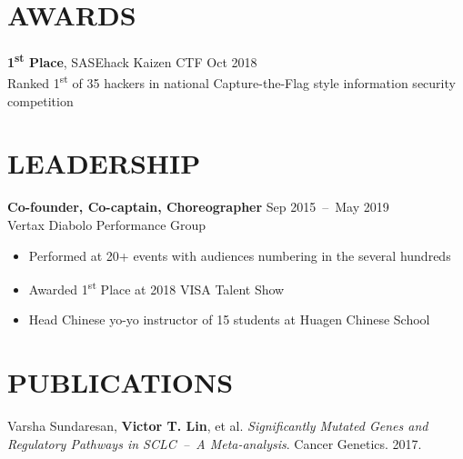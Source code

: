 \documentclass[line,resmargin]{res}
\begin{document}
\begin{resume}
\section{AWARDS}
    \textbf{1\textsuperscript{st} Place}, SASEhack Kaizen CTF    \hfill Oct 2018 \\
    Ranked 1\textsuperscript{st} of 35 hackers in national Capture-the-Flag style information security competition

\section{LEADERSHIP}
    \textbf{Co-founder, Co-captain, Choreographer}    \hfill Sep 2015~--~May 2019 \\
    Vertax Diabolo Performance Group
    \begin{itemize}  \itemsep -2pt
        \item Performed at 20+ events with audiences numbering in the several hundreds
        \item Awarded 1\textsuperscript{st} Place at 2018 VISA Talent Show
        \item Head Chinese yo-yo instructor of 15 students at Huagen Chinese School
    \end{itemize}



\section{PUBLICATIONS}
    Varsha Sundaresan, \textbf{Victor T. Lin}, et al.
    \textit{Significantly Mutated Genes and Regulatory Pathways in SCLC~--~A Meta-analysis}. Cancer Genetics. 2017.

\end{resume}
\end{document}
